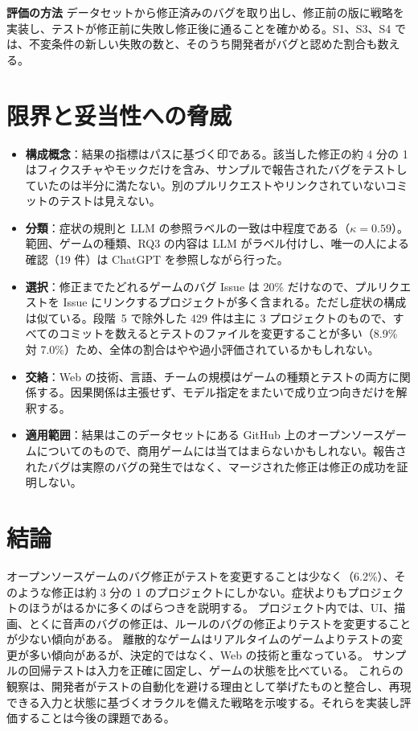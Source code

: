 \documentclass[a4paper,twocolumn,9pt]{ltjsarticle}
\newcommand{\para}[1]{\par\smallskip\noindent\textbf{#1}\quad}
\begin{document}
\para{評価の方法}
データセットから修正済みのバグを取り出し、修正前の版に戦略を実装し、テストが修正前に失敗し修正後に通ることを確かめる。S1、S3、S4 では、不変条件の新しい失敗の数と、そのうち開発者がバグと認めた割合も数える。

\section{限界と妥当性への脅威}\label{sec:limitations}

\begin{itemize}
\item \textbf{構成概念}：結果の指標はパスに基づく印である。該当した修正の約 4 分の 1 はフィクスチャやモックだけを含み、サンプルで報告されたバグをテストしていたのは半分に満たない。別のプルリクエストやリンクされていないコミットのテストは見えない。
\item \textbf{分類}：症状の規則と LLM の参照ラベルの一致は中程度である（$\kappa=0.59$）。範囲、ゲームの種類、RQ3 の内容は LLM がラベル付けし、唯一の人による確認（19 件）は ChatGPT を参照しながら行った。
\item \textbf{選択}：修正までたどれるゲームのバグ Issue は 20\% だけなので、プルリクエストを Issue にリンクするプロジェクトが多く含まれる。ただし症状の構成は似ている。段階~5 で除外した 429 件は主に 3 プロジェクトのもので、すべてのコミットを数えるとテストのファイルを変更することが多い（8.9\% 対 7.0\%）ため、全体の割合はやや過小評価されているかもしれない。
\item \textbf{交絡}：Web の技術、言語、チームの規模はゲームの種類とテストの両方に関係する。因果関係は主張せず、モデル指定をまたいで成り立つ向きだけを解釈する。
\item \textbf{適用範囲}：結果はこのデータセットにある GitHub 上のオープンソースゲームについてのもので、商用ゲームには当てはまらないかもしれない。報告されたバグは実際のバグの発生ではなく、マージされた修正は修正の成功を証明しない。
\end{itemize}

\section{結論}
オープンソースゲームのバグ修正がテストを変更することは少なく（6.2\%）、そのような修正は約 3 分の 1 のプロジェクトにしかない。症状よりもプロジェクトのほうがはるかに多くのばらつきを説明する。
プロジェクト内では、UI、描画、とくに音声のバグの修正は、ルールのバグの修正よりテストを変更することが少ない傾向がある。
離散的なゲームはリアルタイムのゲームよりテストの変更が多い傾向があるが、決定的ではなく、Web の技術と重なっている。
サンプルの回帰テストは入力を正確に固定し、ゲームの状態を比べている。
これらの観察は、開発者がテストの自動化を避ける理由として挙げたものと整合し、再現できる入力と状態に基づくオラクルを備えた戦略を示唆する。それらを実装し評価することは今後の課題である。
\end{document}
